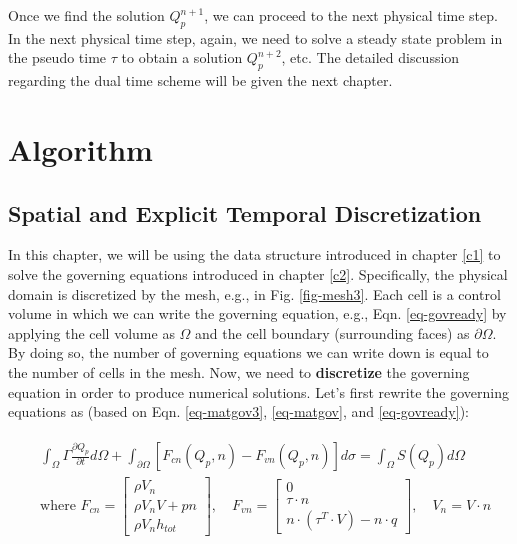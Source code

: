 \documentclass[12pt, letterpaper]{report}
\begin{document}
Once we find the solution $Q_p^{n+1}$, we can proceed to the next physical time step. In the next
physical time step, again, we need to solve a steady state problem in the pseudo time $\tau$ to
obtain a solution $Q_p^{n+2}$, etc. The detailed discussion regarding the dual time scheme will be
given the next chapter.\paraspace


\chapter{Algorithm}

\section{Spatial and Explicit Temporal Discretization}

In this chapter, we will be using the data structure introduced in chapter \ref{c1} to solve the
governing equations introduced in chapter \ref{c2}. Specifically, the physical domain is discretized
by the mesh, e.g., in Fig. \ref{fig-mesh3}. Each cell is a control volume in which we can write the
governing equation, e.g., Eqn. \ref{eq-govready} by applying the cell volume as $\Omega$ and the
cell boundary (surrounding faces) as $\partial\Omega$. By doing so, the number of governing
equations we can write down is equal to the number of cells in the mesh. Now, we need to {\bf
discretize} the governing equation in order to produce numerical solutions. Let's first rewrite the
governing equations as (based on Eqn. \ref{eq-matgov3}, \ref{eq-matgov}, and \ref{eq-govready}):

\begin{align}\label{eq-govalg}
\begin{split}
   &\int_{\Omega} \Gamma \frac{\partial Q_p}{\partial t} d\Omega + \int_{\partial\Omega}
   [F_{cn}(Q_p, n) - F_{vn}(Q_p, n)] d\sigma = \int_{\Omega} S(Q_p) d\Omega \\
   &\textrm{where  } F_{cn} = \begin{bmatrix}\rho V_n \\ \rho V_n V + pn \\ \rho V_n
      h_{tot}\end{bmatrix}, \quad F_{vn} = \begin{bmatrix}0 \\ \tau \cdot n \\ n \cdot (\tau^T \cdot
   V) - n \cdot q\end{bmatrix}, \quad V_n = V \cdot n
\end{split}
\end{align}
\end{document}
